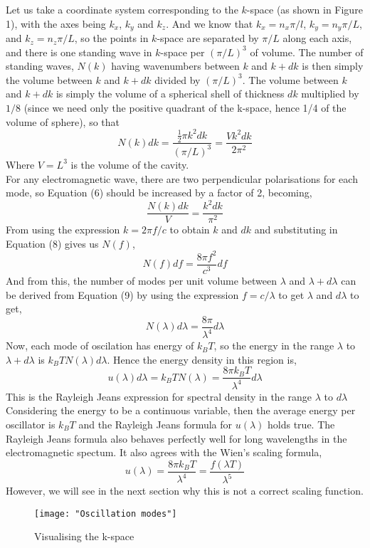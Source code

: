 Let us take a coordinate system corresponding to the $k$-space (as shown in Figure 1), with the axes being $k_x$, $k_y$ and $k_z$. And we know that $k_x=n_x\pi/l$, $k_y=n_y\pi/L$, and $k_z=n_z\pi/L$, so the points in $k$-space are separated by $\pi/L$ along each axis, and there is one standing wave in $k$-space per $(\pi/L)^3$ of volume. The number of standing waves, $N(k)$ having wavenumbers between $k$ and $k+dk$ is then simply the volume between $k$ and $k+dk$ divided by $(\pi/L)^3$. The volume between $k$ and $k+dk$ is simply the volume of a spherical shell of thickness $dk$ multiplied by $1/8$ (since we need only the positive quadrant of the k-space, hence 1/4 of the volume of sphere), so that
\begin{equation}
	N(k)dk=\frac{\frac{1}{2}\pi k^2dk}{(\pi/L)^3}=\frac{Vk^2dk}{2\pi^2}
\end{equation}
Where $V=L^3$ is the volume of the cavity.\\
For any electromagnetic wave, there are two perpendicular polarisations for each mode, so Equation (6) should be increased by a factor of 2, becoming,
\begin{equation}
	\frac{N(k)dk}{V}=\frac{k^2dk}{\pi^2}
\end{equation}
From using the expression $k=2\pi f/c$ to obtain $k$ and $dk$ and substituting in Equation (8) gives us $N(f)$,
\begin{equation}
	N(f)df=\frac{8\pi f^2}{c^3}df
\end{equation}
And from this, the number of modes per unit volume between $\lambda$ and $\lambda + d\lambda$ can be derived from Equation (9) by using the expression $f=c/\lambda$ to get $\lambda$ and $d\lambda$ to get,
\begin{equation}
	N(\lambda)d\lambda=\frac{8\pi}{\lambda^4}d\lambda
\end{equation}
Now, each mode of oscilation has energy of $k_BT$, so the energy in the range $\lambda$ to $\lambda+d\lambda$ is $k_BTN(\lambda)d\lambda$. Hence the energy density in this region is,
\begin{equation}
	u(\lambda)d\lambda = k_BTN(\lambda)=\frac{8\pi k_BT}{\lambda^4}d\lambda
\end{equation}
This is the Rayleigh Jeans expression for spectral density in the range $\lambda$ to $d\lambda$
Considering the energy to be a continuous variable, then the average energy per oscillator is $k_BT$ and the Rayleigh Jeans formula for $u(\lambda)$ holds true. The Rayleigh Jeans formula also behaves perfectly well for long wavelengths in the electromagnetic spectum. It also agrees with the Wien's scaling formula,
\begin{equation}
	u(\lambda)=\frac{8\pi k_BT}{\lambda^4}=\frac{f(\lambda T)}{\lambda^5}
\end{equation}
However, we will see in the next section why this is not a correct scaling function.\\
\begin{figure}[h]
	\centering
	\texttt{[image: "Oscillation modes"]}
	\caption[Visualising the k-space]{Visualising the k-space}
	\label{fig:oscillation-modes}
\end{figure}
\newpage

